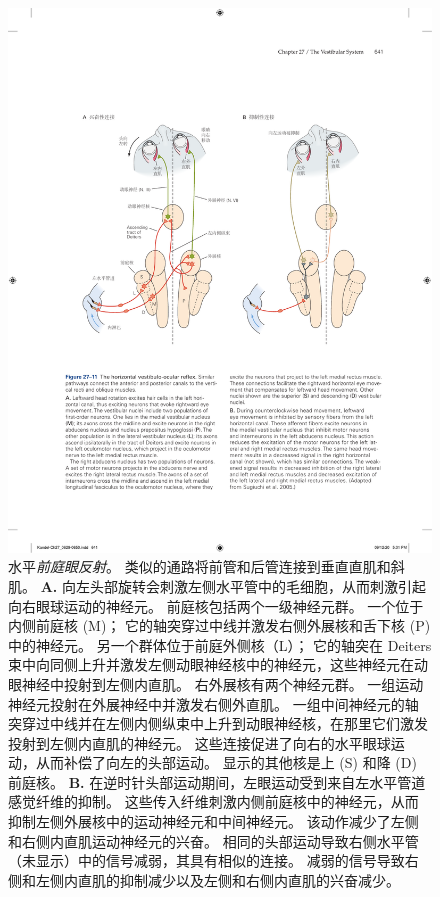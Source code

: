\begin{figure}[htbp]
	\centering
	\includegraphics[width=0.9\linewidth]{chap27/fig_27_11}
	\caption{水平\textit{前庭眼反射}。
		类似的通路将前管和后管连接到垂直直肌和斜肌。
		\textbf{A.} 向左头部旋转会刺激左侧水平管中的毛细胞，从而刺激引起向右眼球运动的神经元。
		前庭核包括两个一级神经元群。
		一个位于内侧前庭核 (M)；
		它的轴突穿过中线并激发右侧外展核和舌下核 (P) 中的神经元。
		另一个群体位于前庭外侧核（L）；
		它的轴突在 Deiters 束中向同侧上升并激发左侧动眼神经核中的神经元，这些神经元在动眼神经中投射到左侧内直肌。
		右外展核有两个神经元群。 一组运动神经元投射在外展神经中并激发右侧外直肌。
		一组中间神经元的轴突穿过中线并在左侧内侧纵束中上升到动眼神经核，在那里它们激发投射到左侧内直肌的神经元。
		这些连接促进了向右的水平眼球运动，从而补偿了向左的头部运动。
		显示的其他核是上 (S) 和降 (D) 前庭核。
		\textbf{B.} 在逆时针头部运动期间，左眼运动受到来自左水平管道感觉纤维的抑制。
		这些传入纤维刺激内侧前庭核中的神经元，从而抑制左侧外展核中的运动神经元和中间神经元。
		该动作减少了左侧和右侧内直肌运动神经元的兴奋。
		相同的头部运动导致右侧水平管（未显示）中的信号减弱，其具有相似的连接。
		减弱的信号导致右侧和左侧内直肌的抑制减少以及左侧和右侧内直肌的兴奋减少\cite{sugiuchi2005vestibular}。}
	\label{fig:27_11}
\end{figure}


